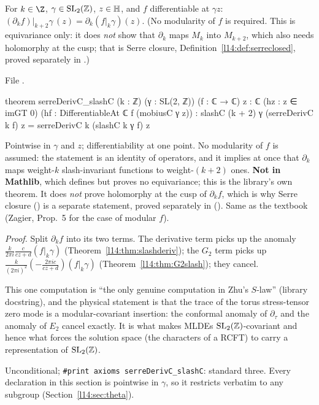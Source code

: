 \begin{theorem}\label{l14:thm:serreslash}
For $k\in\Z$, $\gamma\in\mathrm{SL}_2(\mathbb{Z})$, $z\in\mathbb{H}$, and $f$ differentiable at $\gamma z$:
$(\partial_kf)|_{k+2}\gamma\,(z) = \partial_k(f|_k\gamma)(z)$. (No modularity of $f$ is required. This is equivariance only:
it does \emph{not} show that $\partial_k$ maps $M_k$ into $M_{k+2}$, which also needs holomorphy at the cusp; that is
Serre closure, Definition~\ref{l14:def:serreclosed}, proved separately in .)
\end{theorem}
\noindent File .
\begin{leancode}
theorem serreDerivC_slashC (k : ℤ) (γ : SL(2, ℤ)) (f : ℂ → ℂ) {z : ℂ} (hz : z ∈ imGT 0)
    (hf : DifferentiableAt ℂ f (mobiusC γ z)) :
    slashC (k + 2) γ (serreDerivC k f) z = serreDerivC k (slashC k γ f) z
\end{leancode}
\begin{dictionary}
Pointwise in $\gamma$ and $z$; differentiability at one point. No modularity of $f$ is assumed: the statement is an identity of
operators, and it implies at once that $\partial_k$ maps weight-$k$ slash-invariant functions to weight-$(k+2)$ ones.
\textbf{Not in Mathlib}, which defines  but proves no equivariance; this is the library's own theorem.
It does \emph{not} prove holomorphy at the cusp of $\partial_kf$, which is why Serre closure () is
a separate statement, proved separately in  (). Same as the textbook (Zagier, Prop.~5 for the case of modular $f$).
\end{dictionary}
\noindent\emph{Proof.} Split $\partial_kf$ into its two terms. The derivative term picks up the anomaly
$\frac{k}{2\pi i}\frac{c}{cz+d}(f|_k\gamma)$ (Theorem~\ref{l14:thm:slashderiv}); the $G_2$ term picks up
$\frac{k}{(2\pi i)^2}(-\frac{2\pi ic}{cz+d})(f|_k\gamma)$ (Theorem~\ref{l14:thm:G2slash}); they cancel.
\begin{physics}
This one computation is ``the only genuine computation in Zhu's $S$-law'' (library docstring), and the physical statement is
that the trace of the torus stress-tensor zero mode is a modular-covariant insertion: the conformal anomaly of $\partial_\tau$
and the anomaly of $E_2$ cancel exactly. It is what makes MLDEs $\mathrm{SL}_2(\mathbb{Z})$-covariant and hence what forces the solution
space (the characters of a RCFT) to carry a representation of $\mathrm{SL}_2(\mathbb{Z})$.
\end{physics}
\begin{status}
Unconditional; \texttt{\#print axioms serreDerivC\_slashC}: standard three. Every declaration in this section is pointwise in
$\gamma$, so it restricts verbatim to any subgroup (Section~\ref{l14:sec:theta}).
\end{status}

